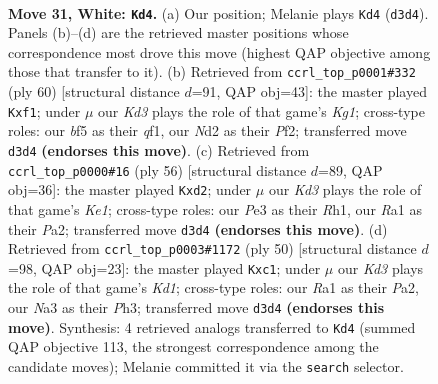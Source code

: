 \documentclass[11pt]{article}
\begin{document}
\clearpage

\begin{figure}[p]\centering
\begin{subfigure}{0.46\textwidth}\centering
\resizebox{\linewidth}{!}{%
\newchessgame
\chessboard[
  setfen={r3r3/1pp3kp/5p2/3p1bb1/P7/N1BKP3/P2N1P2/R2q4 w - - 3 31},
  showmover=false,
  pgfstyle=straightmove, color=movearrow, markmove={d3-d4}
]}
\caption{}
\end{subfigure}\hfill
\begin{subfigure}{0.46\textwidth}\centering
\resizebox{\linewidth}{!}{%
\newchessgame
\chessboard[
  setfen={6k1/pp2r2p/3b4/3P1p1p/P7/5BP1/1P3P2/2R2qK1 w - - 0 31},
  showmover=false,
  pgfstyle=straightmove, color=movearrow, markmove={g1-f1}
]}
\caption{}
\end{subfigure}
\\[4pt]
\begin{subfigure}{0.46\textwidth}\centering
\resizebox{\linewidth}{!}{%
\newchessgame
\chessboard[
  setfen={4r1k1/1p4pp/1pr1Pp2/5P2/bB6/2P5/P2qB1PP/4K2R w K - 0 29},
  showmover=false,
  pgfstyle=straightmove, color=movearrow, markmove={e1-d2}
]}
\caption{}
\end{subfigure}\hfill
\begin{subfigure}{0.46\textwidth}\centering
\resizebox{\linewidth}{!}{%
\newchessgame
\chessboard[
  setfen={2r2r2/1p2k3/p3p2Q/4p1p1/q7/3B2BP/P1N2PP1/2bK4 w - - 0 26},
  showmover=false,
  pgfstyle=straightmove, color=movearrow, markmove={d1-c1}
]}
\caption{}
\end{subfigure}
\caption{\textbf{Move 31, White: \texttt{Kd4}.} (a) Our position; Melanie plays \texttt{Kd4} (\texttt{d3d4}). Panels (b)--(d) are the retrieved master positions whose correspondence most drove this move (highest QAP objective among those that transfer to it). (b) Retrieved from \texttt{ccrl\_top\_p0001\#332} (ply 60) [structural distance $d$=91, QAP obj=43]: the master played \texttt{Kxf1}; under $\mu$ our \emph{Kd3} plays the role of that game's \emph{Kg1}; cross-type roles: our \emph{b}f5 as their \emph{q}f1, our \emph{N}d2 as their \emph{P}f2; transferred move \texttt{d3d4} \textbf{(endorses this move)}. (c) Retrieved from \texttt{ccrl\_top\_p0000\#16} (ply 56) [structural distance $d$=89, QAP obj=36]: the master played \texttt{Kxd2}; under $\mu$ our \emph{Kd3} plays the role of that game's \emph{Ke1}; cross-type roles: our \emph{P}e3 as their \emph{R}h1, our \emph{R}a1 as their \emph{P}a2; transferred move \texttt{d3d4} \textbf{(endorses this move)}. (d) Retrieved from \texttt{ccrl\_top\_p0003\#1172} (ply 50) [structural distance $d$=98, QAP obj=23]: the master played \texttt{Kxc1}; under $\mu$ our \emph{Kd3} plays the role of that game's \emph{Kd1}; cross-type roles: our \emph{R}a1 as their \emph{P}a2, our \emph{N}a3 as their \emph{P}h3; transferred move \texttt{d3d4} \textbf{(endorses this move)}. Synthesis: 4 retrieved analogs transferred to \texttt{Kd4} (summed QAP objective 113, the strongest correspondence among the candidate moves); Melanie committed it via the \texttt{search} selector.}
\label{fig:thought-m60}
\end{figure}
\end{document}

